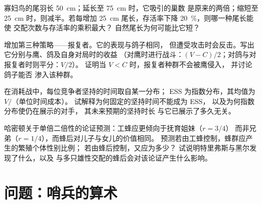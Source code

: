 \begin{exercise}[$\star\star$]\label{exo:b3:behavioural-ecology:9}
寡妇鸟的尾羽长 \qty{50}{cm}；延长至 \qty{75}{cm} 时，它吸引的巢数
是原来的两倍；缩短至 \qty{25}{cm} 时，则减半。若每增加
\qty{25}{cm} 尾长，存活率下降 \qty{20}{\%}，则哪一种尾长能使
交配次数与存活率的乘积最大？
自然尾长为何可能比它短？
\end{exercise}

\begin{exercise}[$\star\star\star$]\label{exo:b3:behavioural-ecology:10}
增加第三种策略——报复者。它的表现与鸽子相同，
但遭受攻击时会反击。写出它分别与鹰、鸽及自身对局时的收益
（对鹰时进行战斗：$(V - C)/2$；对鸽与对报复者时则平分：$V/2$）。
证明当 $V < C$ 时，报复者种群不会被鹰侵入，
并讨论鸽子能否
渗入该种群。
\end{exercise}

\begin{exercise}[$\star\star\star$]\label{exo:b3:behavioural-ecology:11}
在消耗战中，每位竞争者坚持的时间取自某一分布；
ESS 为指数分布，其均值为 $V/$（单位时间成本）。
试解释为何固定的坚持时间不能成为 ESS，
以及为何指数分布使仍在展示的对手，
其未来预期的坚持时长
与它已展示了多久无关。
\end{exercise}

\begin{exercise}[$\star\star\star$]\label{exo:b3:behavioural-ecology:12}
哈密顿关于单倍二倍性的论证预测：工蜂应更倾向于抚育姐妹（$r = 3/4$）
而非兄弟（$r = 1/4$），而蜂后对儿子与女儿的价值相同。
预测若由工蜂控制，蜂群应产生的繁殖个体性别比例；
若由蜂后控制，又应为多少？
试说明特里弗斯与黑尔发现了什么，以及
与多只雄性交配的蜂后会对该论证产生什么影响。
\end{exercise}

\section{问题：哨兵的算术}

